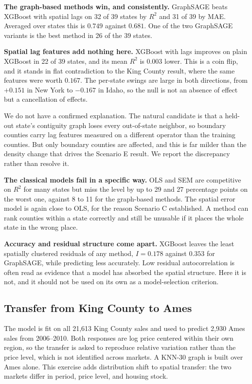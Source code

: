 \documentclass[ASNA, twocolumn]{USG} %
\begin{document}
\textbf{The graph-based methods win, and consistently.} GraphSAGE beats XGBoost with spatial lags on 32 of 39 states by \(R^2\) and 31 of 39 by MAE. Averaged over states this is \(0.749\) against \(0.681\). One of the two GraphSAGE variants is the best method in 26 of the 39 states.

\textbf{Spatial lag features add nothing here.} XGBoost with lags improves on plain XGBoost in 22 of 39 states, and its mean \(R^2\) is \(0.003\) lower. This is a coin flip, and it stands in flat contradiction to the King County result, where the same features were worth \(0.167\). The per-state swings are large in both directions, from \(+0.151\) in New York to \(-0.167\) in Idaho, so the null is not an absence of effect but a cancellation of effects.

We do not have a confirmed explanation. The natural candidate is that a held-out state's contiguity graph loses every out-of-state neighbor, so boundary counties carry lag features measured on a different operator than the training counties. But only boundary counties are affected, and this is far milder than the density change that drives the Scenario E result. We report the discrepancy rather than resolve it.

\textbf{The classical models fail in a specific way.} OLS and SEM are competitive on \(R^2\) for many states but miss the level by up to 29 and 27 percentage points on the worst one, against 8 to 11 for the graph-based methods. The spatial error model is again close to OLS, for the reason Scenario C established. A method can rank counties within a state correctly and still be unusable if it places the whole state in the wrong place.

\textbf{Accuracy and residual structure come apart.} XGBoost leaves the least spatially clustered residuals of any method, \(I=0.178\) against \(0.353\) for GraphSAGE, while predicting less accurately. Low residual autocorrelation is often read as evidence that a model has absorbed the spatial structure. Here it is not, and it should not be used on its own as a model-selection criterion.

\subsection{Transfer from King County to Ames}

The model is fit on all 21,613 King County sales and used to predict 2,930 Ames sales from 2006--2010. Both responses are log price centered within their own region, so the transfer is asked to reproduce relative variation rather than the price level, which is not identified across markets. A KNN-30 graph is built over Ames alone. This exercise adds distribution shift to spatial transfer: the two markets differ in period, price level, and housing stock.
\end{document}
